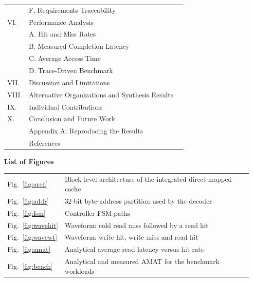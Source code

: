 \documentclass[conference,a4paper]{IEEEtran}
\begin{document}
\begin{tabular}{@{}p{1.2cm}p{12cm}r@{}}
 & \hspace{1em}F. Requirements Traceability & \pageref{sec:trace2}\\
VI. & Performance Analysis & \pageref{sec:perf}\\
 & \hspace{1em}A. Hit and Miss Rates & \pageref{sec:hit}\\
 & \hspace{1em}B. Measured Completion Latency & \pageref{sec:lat}\\
 & \hspace{1em}C. Average Access Time & \pageref{sec:amat}\\
 & \hspace{1em}D. Trace-Driven Benchmark & \pageref{sec:bench}\\
VII. & Discussion and Limitations & \pageref{sec:disc}\\
VIII. & Alternative Organizations and Synthesis Results & \pageref{sec:alt}\\
IX. & Individual Contributions & \pageref{sec:contrib}\\
X. & Conclusion and Future Work & \pageref{sec:concl}\\
 & Appendix A: Reproducing the Results & \pageref{app:repro}\\
 & References & \pageref{sec:refs}\\
\end{tabular}

\vspace{0.3cm}
\noindent\textbf{List of Figures}\\[2pt]
\begin{tabular}{@{}p{1.6cm}p{11.6cm}r@{}}
Fig.~\ref{fig:arch} & Block-level architecture of the integrated direct-mapped cache & \pageref{fig:arch}\\
Fig.~\ref{fig:addr} & 32-bit byte-address partition used by the decoder & \pageref{fig:addr}\\
Fig.~\ref{fig:fsm} & Controller FSM paths & \pageref{fig:fsm}\\
Fig.~\ref{fig:wavehit} & Waveform: cold read miss followed by a read hit & \pageref{fig:wavehit}\\
Fig.~\ref{fig:wavewt} & Waveform: write hit, write miss and read hit & \pageref{fig:wavewt}\\
Fig.~\ref{fig:amat} & Analytical average read latency versus hit rate & \pageref{fig:amat}\\
Fig.~\ref{fig:bench} & Analytical and measured AMAT for the benchmark workloads & \pageref{fig:bench}\\
\end{tabular}
\end{document}
